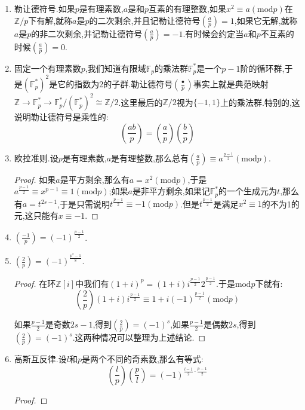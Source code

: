 \begin{enumerate}
	\item 勒让德符号.如果$p$是有理素数,$a$是和$p$互素的有理整数,如果$x^2\equiv a(\mathrm{mod}p)$在$\mathbb{Z}/p$下有解,就称$a$是$p$的二次剩余,并且记勒让德符号$\left(\frac{a}{p}\right)=1$,如果它无解,就称$a$是$p$的非二次剩余,并记勒让德符号$\left(\frac{a}{p}\right)=-1$.有时候会约定当$a$和$p$不互素的时候$\left(\frac{a}{p}\right)=0$.
	\item 固定一个有理素数$p$,我们知道有限域$\mathbb{F}_p$的乘法群$\mathbb{F}_p^*$是一个$p-1$阶的循环群,于是$(\mathbb{F}_p^*)^2$是它的指数为2的子群.勒让德符号$\left(\frac{\bullet}{p}\right)$事实上就是典范映射$\mathbb{Z}\to\mathbb{F}_p^*\to\mathbb{F}_p^*/(\mathbb{F}_p^*)^2\cong\mathbb{Z}/2$.这里最后的$\mathbb{Z}/2$视为$\{-1,1\}$上的乘法群.特别的,这说明勒让德符号是乘性的:
	$$\left(\frac{ab}{p}\right)=\left(\frac{a}{p}\right)\left(\frac{b}{p}\right)$$
	\item 欧拉准则.设$p$是有理素数,$a$是有理整数,那么总有$\left(\frac{a}{p}\right)\equiv a^{\frac{p-1}{2}}(\mathrm{mod}p)$.
	\begin{proof}
		
		如果$a$是平方剩余,那么有$a=x^2(\mathrm{mod}p)$,于是$a^{\frac{p-1}{2}}\equiv x^{p-1}\equiv1(\mathrm{mod}p)$;如果$a$是非平方剩余,如果记$\mathbb{F}_p^*$的一个生成元为$t$,那么有$a=t^{2s-1}$,于是只需说明$t^{\frac{p-1}{2}}\equiv-1(\mathrm{mod}p)$.但是$t^{\frac{p-1}{2}}$是满足$x^2\equiv1$的不为1的元,这只能有$x\equiv-1$.
	\end{proof}
    \item $\left(\frac{-1}{p}\right)=(-1)^{\frac{p-1}{2}}$.
    \item $\left(\frac{2}{p}\right)=(-1)^{\frac{p^2-1}{8}}$.
    \begin{proof}
    	
    	在环$\mathbb{Z}[i]$中我们有$(1+i)^p=(1+i)i^{\frac{p-1}{2}}2^{\frac{p-1}{2}}$.于是$\mathrm{mod}p$下就有:
    	$$\left(\frac{2}{p}\right)(1+i)i^{\frac{p-1}{2}}\equiv1+i(-1)^{\frac{p-1}{2}}(\mathrm{mod}p)$$
    	
    	如果$\frac{p-1}{2}$是奇数$2s-1$,得到$\left(\frac{2}{p}\right)=(-1)^s$,如果$\frac{p-1}{2}$是偶数$2s$,得到$\left(\frac{2}{p}\right)=(-1)^s$.这两种情况可以整理为上述结论.
    \end{proof}
    \item 高斯互反律.设$l$和$p$是两个不同的奇素数,那么有等式:
    $$\left(\frac{l}{p}\right)\left(\frac{p}{l}\right)=(-1)^{\frac{l-1}{2}\cdot\frac{p-1}{2}}$$
    \begin{proof}
    	

\end{proof}
\end{enumerate}
